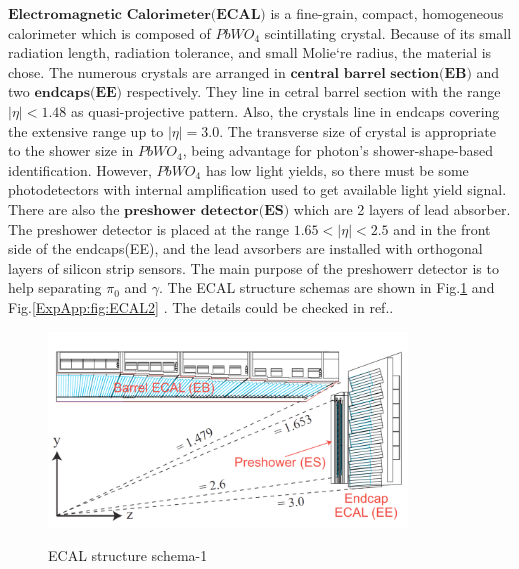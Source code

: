 			$\textbf{Electromagnetic Calorimeter(ECAL)}$ is a fine-grain, compact, homogeneous calorimeter which is composed of $PbWO_4$ scintillating crystal. Because of its small radiation length, radiation tolerance, and small Molie`re radius, the material is chose. The numerous crystals are arranged in $\textbf{central}$ $\textbf{barrel}$ $\textbf{section}$$\textbf{(EB)}$ and two $\textbf{endcaps}$$\textbf{(EE)}$ respectively. They line in cetral barrel section with the range $|\eta|<1.48$ as quasi-projective pattern. Also, the crystals line in endcaps covering the extensive range up to $|\eta|=3.0$. The transverse size of crystal is appropriate to the shower size in $PbWO_4$, being advantage for photon's shower-shape-based identification. However, $PbWO_4$ has low light yields, so there must be some photodetectors with internal amplification used to get available light yield signal. There are also the $\textbf{preshower}$ $\textbf{detector}$$\textbf{(ES)}$ which are 2 layers of lead absorber. The preshower detector is placed at the range $1.65<|\eta|<2.5$ and in the front side of the endcaps(EE), and the lead avsorbers are installed with orthogonal layers of silicon strip sensors. The main purpose of the preshowerr detector is to help separating $\pi_0$ and $\gamma$. The ECAL structure schemas are shown in Fig.\ref{ExpApp:fig:ECAL1} and Fig.\ref{ExpApp:fig:ECAL2} . The details could be checked in ref.\cite{ECAL_ex}.


			\begin{figure}[H]
			\centering{}
		    	\includegraphics[width=0.85\textwidth]{Figures/ExpApparatus/ECAL.png}\\
			\caption{ECAL structure schema-1\cite{ECAL_ex}}
			\label{ExpApp:fig:ECAL1}
			\end{figure}
			\FloatBarrier

